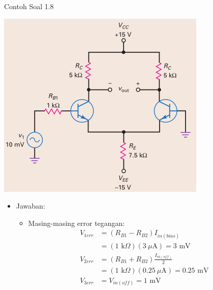 \documentclass[aspectratio=169]{beamer}
\begin{document}
\begin{frame}{Contoh Soal 1.8}
	\begin{multicols}{2}
		\begin{center}
			\includegraphics[height=0.7\textheight]{gambar/01.latihan_soal_8}
		\end{center}
		\columnbreak
		\begin{itemize}
			\item Jawaban:
			\begin{itemize}
				\item Masing-masing error tegangan:
				\begin{align*}
					V_{1err} &= (R_{B1} - R_{B2}) I_{in(bias)} \\
					&= (1 \text{ k}\Omega)(3~\mu\text{A}) = 3 \text{ mV} \\
					V_{2err} &= (R_{B1} + R_{B2}) \frac{I_{in(off)}}{2} \\
					&= (1 \text{ k}\Omega)(0.25~\mu\text{A}) = 0.25 \text{ mV} \\
					V_{3err} &= V_{in(off)} = 1 \text{ mV}
				\end{align*}
			\end{itemize}
		\end{itemize}
	\end{multicols}
\end{frame}
\end{document}
